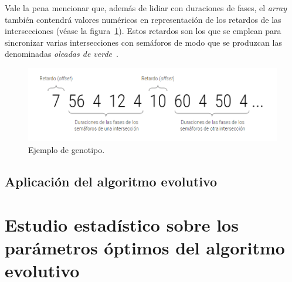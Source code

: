 Vale la pena mencionar que, además de lidiar con duraciones de fases, el \textit{array} también contendrá valores numéricos en representación de los retardos de las intersecciones (véase la figura~\ref{fig:genotipo}). Estos retardos son los que se emplean para sincronizar varias intersecciones con semáforos de modo que se produzcan las denominadas \textit{oleadas de verde}~\cite{segredo_optimising_2019}.


\begin{figure}[ht]
    \centering
    \includegraphics[width=\textwidth]{report/images/genotipo.png}
    \caption{Ejemplo de genotipo.}
    \label{fig:genotipo}
\end{figure}

\subsection{Aplicación del algoritmo evolutivo}



\section{Estudio estadístico sobre los parámetros óptimos del algoritmo evolutivo}


